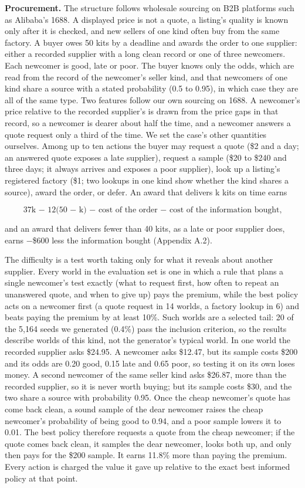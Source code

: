 \textbf{Procurement.} The structure follows wholesale sourcing on B2B platforms such as Alibaba's 1688. A displayed price
is not a quote, a listing's quality is known only after it is checked, and new sellers of one kind often buy from the
same factory. A buyer owes 50 kits by a deadline and awards the order to one supplier: either a recorded supplier with
a long clean record or one of three newcomers. Each newcomer is good, late or poor. The buyer knows only the odds,
which are read from the record of the newcomer's seller kind, and that newcomers of one kind share a source with a
stated probability (0.5 to 0.95), in which case they are all of the same type. Two features follow our own sourcing on 1688.
A newcomer's price relative to the recorded supplier's is drawn from the price gaps in that record, so a
newcomer is dearer about half the time, and a newcomer answers a quote request only a third of the time. We set the
case's other quantities ourselves. Among up to ten actions the buyer may request a quote (\$2 and a day; an answered
quote exposes a late supplier), request a sample (\$20 to \$240 and three days; it always arrives and exposes a poor
supplier), look up a listing's registered factory (\$1; two lookups in one kind show whether the kind shares a
source), award the order, or defer. An award that delivers k kits on time earns

\[ \text{37k − 12(50 − k) − cost of the order − cost of the information bought,} \tag{2} \]

and an award that delivers fewer than 40 kits, as a late or poor supplier does, earns −\$600 less the information
bought (Appendix A.2).

The difficulty is a test worth taking only for what it reveals about another supplier. Every world in the evaluation
set is one in which a rule that plans a single newcomer's test exactly (what to request first, how often to repeat an
unanswered quote, and when to give up) pays the premium, while the best policy acts on a newcomer first (a quote
request in 14 worlds, a factory lookup in 6) and beats paying the premium by at least 10\%. Such worlds are a selected
tail: 20 of the 5,164 seeds we generated (0.4\%) pass the inclusion criterion, so the results describe worlds of this
kind, not the generator's typical world. In one world the recorded supplier asks \$24.95. A newcomer asks \$12.47, but its sample
costs \$200 and its odds are 0.20 good, 0.15 late and 0.65 poor, so testing it on its own loses money. A second
newcomer of the same seller kind asks \$26.87, more than the recorded supplier, so it is never worth buying; but its
sample costs \$30, and the two share a source with probability 0.95. Once the cheap newcomer's quote has come back
clean, a sound sample of the dear newcomer raises the cheap newcomer's probability of being good to 0.94, and a poor
sample lowers it to 0.01. The best policy therefore requests a quote from the cheap newcomer; if the quote comes back
clean, it samples the dear newcomer, looks both up, and only then pays for the \$200 sample. It earns 11.8\% more than
paying the premium. Every action is charged the value it gave up relative to the exact best informed policy at that
point.

